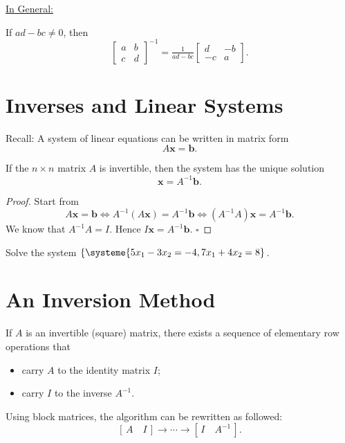 \documentclass[20pt,a4paper]{extarticle}
\newcounter{example}
\newcounter{theorem}
\newcounter{algo}
\begin{document}
\begin{solution}

\end{solution}

\vfill 

\underline{In General:}

If $ad - bc \neq 0$, then
$$
	\begin{bmatrix} a & b \\ c & d \end{bmatrix}^{-1} = \tfrac{1}{ad - bc} \begin{bmatrix} d & -b \\ -c & a \end{bmatrix} .
$$

\newpage 

\section{Inverses and Linear Systems}

Recall: A system of linear equations can be written in matrix form
	\[
		A \mathbf{x} = \mathbf{b} .
	\]

\begin{theorem}
If the $n \times n$ matrix $A$ is invertible, then the system has the unique solution
	\[
		\mathbf{x} = A^{-1} \mathbf{b} .
	\]
\end{theorem}

\begin{proof}
Start from
	\[
		A \mathbf{x} = \mathbf{b} \iff A^{-1} (A \mathbf{x}) = A^{-1} \mathbf{b} \iff (A^{-1} A) \mathbf{x} = A^{-1} \mathbf{b} .
	\]
We know that $A^{-1} A = I$. Hence $I\mathbf{x} = A^{-1} \mathbf{b}$. \hfill $\square$
\end{proof}

\begin{example}
Solve the system $\left\lbrace \systeme{5x_1 - 3x_2 = -4, 7x_1 + 4x_2 = 8} \right.$.
\end{example}

\begin{solution}

\end{solution}

\newpage 

\section{An Inversion Method}

\begin{algorithm}
If $A$ is an invertible (square) matrix, there exists a sequence of elementary row operations that 
	\begin{itemize}
		\item carry $A$ to the identity matrix $I$;
		\item carry $I$ to the inverse $A^{-1}$.
	\end{itemize}
Using block matrices, the algorithm can be rewritten as followed:
	\[
		[ \, A \quad I \, ] \longrightarrow \cdots \longrightarrow [\, I \quad A^{-1} \, ] .
	\]
\end{algorithm}
\end{document}
